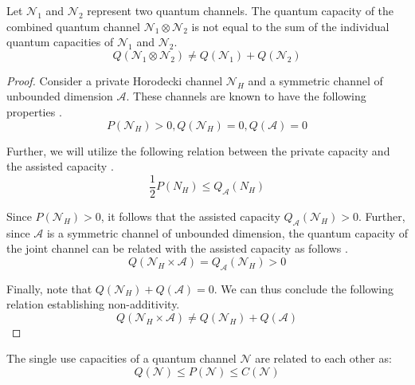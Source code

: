 \begin{theorem}
Let $\mathcal{N}_1$ and $\mathcal{N}_2$ represent two quantum channels. The quantum capacity of the combined quantum channel $\mathcal{N}_1 \otimes \mathcal{N}_2$ is not equal to the sum of the individual quantum capacities of $\mathcal{N}_1$ and $\mathcal{N}_2$.
$$Q(\mathcal{N}_1 \otimes \mathcal{N}_2) \neq Q(\mathcal{N}_1) + Q(\mathcal{N}_2)$$
\end{theorem}

\begin{proof}
Consider a private Horodecki channel $\mathcal{N}_H$ and a symmetric channel of unbounded dimension $\mathcal{A}$. These channels are known to have the following properties \cite{Horodecki_1996} \cite{Horodecki_1997} \cite{Smith_2008_Symmetric}.
$$P(\mathcal{N}_H) > 0, Q(\mathcal{N}_H) = 0, Q(\mathcal{A}) = 0$$

Further, we will utilize the following relation between the private capacity and the assisted capacity \cite{Smith_2008}.
$$\frac{1}{2} P(N_H) \leq Q_\mathcal{A}(N_H)$$

Since $P(\mathcal{N}_H) > 0$, it follows that the assisted capacity $Q_\mathcal{A}(\mathcal{N}_H) > 0$. Further, since $\mathcal{A}$ is a symmetric channel of unbounded dimension, the quantum capacity of the joint channel can be related with the assisted capacity as follows \cite{Smith_2008_Symmetric}.
$$Q(\mathcal{N}_H \times \mathcal{A}) = Q_\mathcal{A}(\mathcal{N}_H) > 0$$

Finally, note that $Q(\mathcal{N}_H) + Q(\mathcal{A}) = 0$. We can thus conclude the following relation establishing non-additivity.
$$Q(\mathcal{N}_H \times \mathcal{A}) \neq Q(\mathcal{N}_H) + Q(\mathcal{A})$$
\end{proof}

\begin{theorem}
The single use capacities of a quantum channel $\mathcal{N}$ are related to each other as:
$$Q(\mathcal{N}) \leq P(\mathcal{N}) \leq C(\mathcal{N})$$
\end{theorem}

